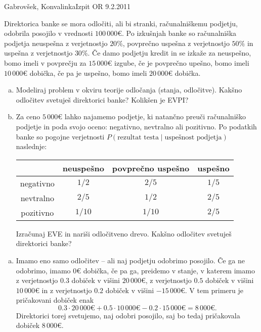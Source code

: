 \begin{naloga}{Gabrovšek, Konvalinka}{Izpit OR 9.2.2011}
\begin{vprasanje}
Direktorica banke se mora odločiti, ali bi stranki, računalniškemu podjetju,
odobrila posojilo v vrednosti $100\,000 €$.
Po izkušnjah banke so računalniška podjetja neuspešna z verjetnostjo $20 \%$,
povprečno uspešna z verjetnostjo $50 \%$ in uspešna z verjetnostjo $30 \%$.
Če damo podjetju kredit in se izkaže za neuspešno,
bomo imeli v povprečju za $15\,000 €$ izgube,
če je povprečno upešno, bomo imeli $10\,000 €$ dobička,
če pa je uspešno, bomo imeli $20\,000 €$ dobička.
\begin{enumerate}[(a)]
\item Modeliraj problem v okviru teorije odločanja (stanja, odločitve).
Kakšno odločitev svetuješ direktorici banke?
Kolikšen je EVPI?

\item Za ceno $5\,000 €$ lahko najamemo podjetje,
ki natančno preuči računalniško podjetje in poda svojo oceno:
negativno, nevtralno ali pozitivno.
Po podatkih banke so pogojne verjetnosti
$P(\text{rezultat testa} \;|\; \text{uspešnost podjetja})$ naslednje:
\begin{center}
\begin{tabular}{c|ccc}
& neuspešno & povprečno uspešno & uspešno \\ \hline
negativno & $1/2$  & $2/5$  & $1/5$ \\
nevtralno & $2/5$  & $1/2$  & $2/5$ \\
pozitivno & $1/10$ & $1/10$ & $2/5$
\end{tabular}
\end{center}
Izračunaj EVE in nariši odločitveno drevo.
Kakšno odločitev svetuješ direktorici banke?
\end{enumerate}
\end{vprasanje}

\begin{odgovor}
\begin{enumerate}[(a)]
\item Imamo eno samo odločitev
-- ali naj podjetju odobrimo posojilo.
Če ga ne odobrimo, imamo $0 €$ dobička,
če pa ga, preidemo v stanje,
v katerem imamo z verjetnostjo $0.3$ dobiček v višini $20\,000 €$,
z verjetnostjo $0.5$ dobiček v višini $10\,000 €$
in z verjetnostjo $0.2$ dobiček v višini $-15\,000 €$.
V tem primeru je pričakovani dobiček enak
$$
0.3 \cdot 20\,000 € + 0.5 \cdot 10\,000 € - 0.2 \cdot 15\,000 € = 8\,000 € .
$$
Direktorici torej svetujemo, naj odobri posojilo,
saj bo tedaj pričakovala dobiček $8\,000 €$.


\end{enumerate}
\end{odgovor}
\end{naloga}

